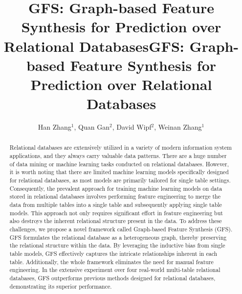 \title{GFS: Graph-based Feature Synthesis for Prediction over Relational Databases}



\title{GFS: Graph-based Feature Synthesis for Prediction over Relational Databases}

\author{Han Zhang$^{1}$, Quan Gan$^{2}$, David Wipf$^{2}$, Weinan Zhang$^{1}$}
\newcommand{\david}[1]{{\color{red} [David: ``#1'']}}
\newcommand{\han}[1]{{\color{blue} [Han: ``#1'']}}
\newcommand{\quan}[1]{{\color{olive} [Quan: ``#1'']}}
\newcommand{\weinan}[1]{{\color{magenta} [Weinan: ``#1'']}}
\newcommand{\minjie}[1]{\color{yellow} [Minjie: ``#1'']}

\newcommand{\model}{{GFS}}

\newtheorem{remark}{Remark}

\def\header{\vspace{2.5mm} \noindent}

\begin{abstract}
Relational databases are extensively utilized in a variety of modern information system applications, and they always carry valuable data patterns. There are a huge number of data mining or machine learning tasks conducted on relational databases. However, it is worth noting that there are limited machine learning models specifically designed for relational databases, as most models are primarily tailored for single table settings. Consequently, the prevalent approach for training machine learning models on data stored in relational databases involves performing feature engineering to merge the data from multiple tables into a single table and subsequently applying single table models. This approach not only requires significant effort in feature engineering but also destroys the inherent relational structure present in the data.  To address these challenges, we propose a novel framework called Graph-based Feature Synthesis (\model{}). \model{} formulates the relational database as a heterogeneous graph, thereby preserving the relational structure within the data. By leveraging the inductive bias from single table models, \model{} effectively captures the intricate relationships inherent in each table. Additionally, the whole framework eliminates the need for manual feature engineering. In the extensive experiment over four real-world multi-table relational databases, \model{} outperforms previous methods designed for relational databases, demonstrating its superior performance.
\end{abstract}


